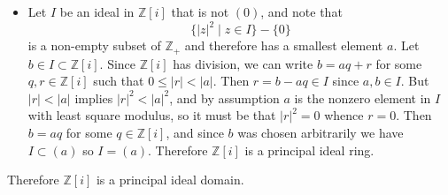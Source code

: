 \documentclass{article}
\begin{document}
\begin{Answer}
\begin{enumerate}[(a)]
{\begin{itemize}
{        }
        \item{
          Let $I$ be an ideal in $\mathbb{Z}[i]$ that is not $(0)$, and
          note that
          $$
          \{ |z|^2 \mid z \in I \} - \{ 0 \}
          $$
          is a non-empty subset of $\mathbb{Z}_+$ and therefore has a
          smallest element $a$. Let $b \in I \subset \mathbb{Z}[i]$. Since
          $\mathbb{Z}[i]$ has division, we can write
          $b = aq + r$ for some $q, r \in \mathbb{Z}[i]$ such that
          $0 \leq |r| < |a|$. Then $r = b - aq \in I$ since $a, b \in I$.
          But $|r| < |a|$ implies $|r|^2 < |a|^2$, and by assumption
          $a$ is the nonzero element in $I$ with least square modulus, so
          it must be that $|r|^2 = 0$ whence $r = 0$. Then $b = aq$ for
          some $q \in \mathbb{Z}[i]$, and since $b$ was chosen arbitrarily
          we have $I \subset (a)$ so $I = (a)$. Therefore $\mathbb{Z}[i]$
          is a principal ideal ring.
        }
      \end{itemize}
      Therefore $\mathbb{Z}[i]$ is a principal ideal domain.
    }
  \end{enumerate}
\end{Answer}
\end{document}
